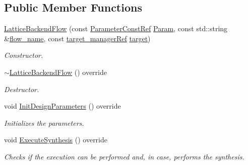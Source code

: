 \subsection*{Public Member Functions}
\begin{DoxyCompactItemize}
\item 
\hyperlink{classLatticeBackendFlow_aa76f249f857e30947adab351737266c9}{Lattice\+Backend\+Flow} (const \hyperlink{Parameter_8hpp_a37841774a6fcb479b597fdf8955eb4ea}{Parameter\+Const\+Ref} \hyperlink{classBackendFlow_a7d21e7cf0afc64b13e0009c9e351873d}{Param}, const std\+::string \&\hyperlink{classBackendFlow_acb230ccab7e32cf0a88811097ff8c3f8}{flow\+\_\+name}, const \hyperlink{target__manager_8hpp_aee0b586a84fb6eb4faefa6e41e1735a9}{target\+\_\+manager\+Ref} \hyperlink{classBackendFlow_a693ab6eaf29b1836eb91dcd92eb0189f}{target})
\begin{DoxyCompactList}\small\item\em Constructor. \end{DoxyCompactList}\item 
\hyperlink{classLatticeBackendFlow_a0d52950634971fbf55dfac701afddaf5}{$\sim$\+Lattice\+Backend\+Flow} () override
\begin{DoxyCompactList}\small\item\em Destructor. \end{DoxyCompactList}\item 
void \hyperlink{classLatticeBackendFlow_af31a3f147ec929266a696904d911ff6e}{Init\+Design\+Parameters} () override
\begin{DoxyCompactList}\small\item\em Initializes the parameters. \end{DoxyCompactList}\item 
void \hyperlink{classLatticeBackendFlow_adc9bf997d1ac830c4511521b1934bffc}{Execute\+Synthesis} () override
\begin{DoxyCompactList}\small\item\em Checks if the execution can be performed and, in case, performs the synthesis. \end{DoxyCompactList}\end{DoxyCompactItemize}
